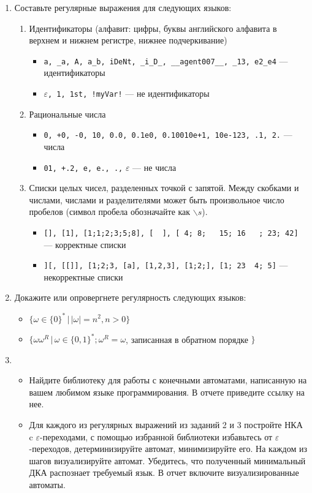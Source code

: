\documentclass[12pt]{article}
\begin{document}
\begin{enumerate}
  \item
  { Составьте регулярные выражения для следующих языков: 
    \begin{enumerate}
      \item 
      { Идентификаторы (алфавит: цифры, буквы английского алфавита в верхнем и нижнем регистре, нижнее подчеркивание)
        \begin{itemize}
          \item \verb;a, _a, A, a_b, iDeNt, _i_D_, __agent007__, _13, e2_e4; --- идентификаторы
          \item $\varepsilon$\verb;, 1, 1st, !myVar!; --- не идентификаторы
        \end{itemize}
      }
      \item 
      { Рациональные числа
        \begin{itemize} 
          \item \verb;0, +0, -0, 10, 0.0, 0.1e0, 0.10010e+1, 10e-123, .1, 2.; --- числа
          \item \verb;01, +.2, e, e., .,; $\varepsilon$ --- не числа
        \end{itemize}
      }
      \item
      { Списки целых чисел, разделенных точкой с запятой. Между скобками и числами, числами и разделителями может быть произвольное число пробелов (символ пробела обозначайте как $\backslash s$). 
        \begin{itemize} 
          \item \verb![], [1], [1;1;2;3;5;8], [  ], [ 4; 8;   15; 16   ; 23; 42]! --- корректные списки
          \item \verb!][, [[]], [1;2;3, [a], [1,2,3], [1;2;], [1; 23  4; 5]! --- некорректные списки
        \end{itemize}
      }
    \end{enumerate}
  }
  \item 
  {
    Докажите или опровергнете регулярность следующих языков:
    \begin{itemize}
        \item $\{ \omega \in \{ 0 \}^* \,|  \,|\omega| = n^2, n > 0\}$
        \item $\{ \omega \omega^R \, | \, \omega \in \{ 0, 1\}^*; \omega^R = \omega$, записанная в обратном порядке $\}$
    \end{itemize} 
  }
  \item 
  { \begin{itemize}
      \item Найдите библиотеку для работы с конечными автоматами, написанную на вашем любимом языке программирования. В отчете приведите ссылку на нее. 
      \item Для каждого из регулярных выражений из заданий 2 и 3 постройте НКА c $\varepsilon$-переходами, с помощью избранной библиотеки избавьтесь от $\varepsilon$-переходов, детерминизируйте автомат, минимизируйте его. На каждом из шагов визуализируйте автомат. Убедитесь, что полученный минимальный ДКА распознает требуемый язык. В отчет включите визуализированные автоматы.
    \end{itemize}
  }
\end{enumerate}

\end{document}

